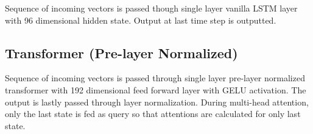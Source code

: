 Sequence of incoming vectors is passed though single layer vanilla LSTM layer with 96 dimensional hidden state. 
Output at last time step is outputted. 

\subsection{Transformer (Pre-layer Normalized)}

Sequence of incoming vectors is passed through single layer pre-layer normalized transformer with 192 dimensional feed forward layer with GELU activation. 
The output is lastly passed through layer normalization. 
During multi-head attention, only the last state is fed as query so that attentions are calculated for only last state. 


